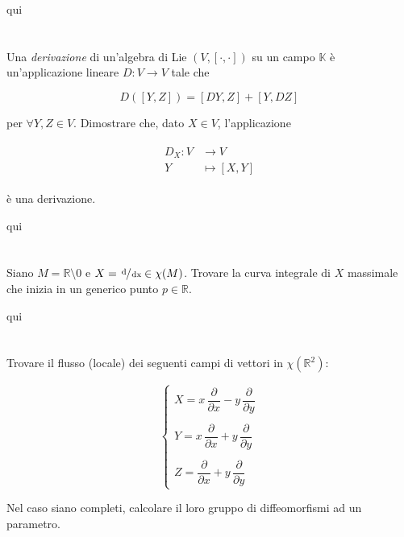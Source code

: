 qui

\section{}\label{es2-28}

\begin{tcolorbox}
	Una \textit{derivazione} di un'algebra di Lie $ (V,[\cdot,\cdot]) $ su un campo $ \mathbb{K} $ è un'applicazione lineare $ D : V \to V $ tale che
	
	\begin{equation}
		D([Y,Z]) = [DY,Z] + [Y,DZ]
	\end{equation}

	per $ \forall Y,Z \in V $. Dimostrare che, dato $ X \in V $, l'applicazione
	
	\begin{align}
		\begin{split}
			D_{X} : V &\to V\\
			Y &\mapsto [X,Y]
		\end{split}
	\end{align}

	è una derivazione.
\end{tcolorbox}

qui

\section{}\label{es2-29}

\begin{tcolorbox}
	Siano $ M = \mathbb{R} \setminus 0 $ e $ X = \sfrac{\operatorname{d}}{\operatorname{dx}} \in \chi(M) $. Trovare la curva integrale di $ X $ massimale che inizia in un generico punto $ p \in \mathbb{R} $.
\end{tcolorbox}

qui

\section{}\label{es2-30}

\begin{tcolorbox}
	Trovare il flusso (locale) dei seguenti campi di vettori in $ \chi(\mathbb{R}^{2}) $:
	
	\begin{equation}
		\begin{cases}
			X = x \, \dfrac{\partial}{\partial x} - y \, \dfrac{\partial}{\partial y}\\\\
			Y = x \, \dfrac{\partial}{\partial x} + y \, \dfrac{\partial}{\partial y}\\\\
			Z = \dfrac{\partial}{\partial x} + y \, \dfrac{\partial}{\partial y}
		\end{cases}
	\end{equation}

	Nel caso siano completi, calcolare il loro gruppo di diffeomorfismi ad un parametro.
\end{tcolorbox}

